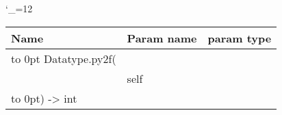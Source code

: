 \begingroup \catcode`\_=12 \tt
\begin{tabular}{lll}
\toprule
\textrm{Name}&\textrm{Param name}&\textrm{param type}\\
\midrule
\hbox to 0pt {Datatype.py2f(\hss}\\
& self\\
\hbox to 0pt{) -> int\hss}\\
\bottomrule
\end{tabular}
\endgroup

